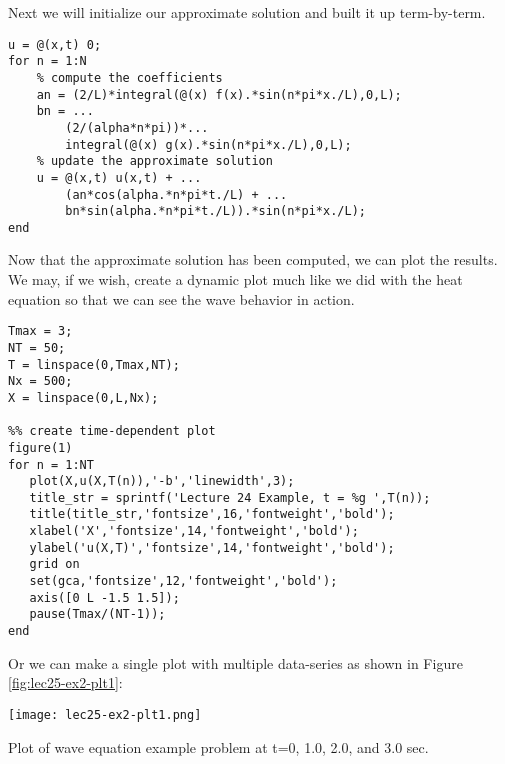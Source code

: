 \vspace{0.5cm}

\noindent Next we will initialize our approximate solution and built it up term-by-term.

\begin{lstlisting}[style=myMatlab, name=lec25-ex2]
u = @(x,t) 0;
for n = 1:N
    % compute the coefficients
    an = (2/L)*integral(@(x) f(x).*sin(n*pi*x./L),0,L);
    bn = ...
        (2/(alpha*n*pi))*...
        integral(@(x) g(x).*sin(n*pi*x./L),0,L);
    % update the approximate solution
    u = @(x,t) u(x,t) + ...
        (an*cos(alpha.*n*pi*t./L) + ...
        bn*sin(alpha.*n*pi*t./L)).*sin(n*pi*x./L); 
end
\end{lstlisting}

\vspace{0.25cm}

\noindent Now that the approximate solution has been computed, we can plot the results.  We may, if we wish, create a dynamic plot much like we did with the heat equation so that we can see the wave behavior in action.

\begin{lstlisting}[style=myMatlab, name=lec25-ex2]
%% make discrete space and time space vectors
Tmax = 3;
NT = 50;
T = linspace(0,Tmax,NT);
Nx = 500;
X = linspace(0,L,Nx);

%% create time-dependent plot
figure(1)
for n = 1:NT
   plot(X,u(X,T(n)),'-b','linewidth',3); 
   title_str = sprintf('Lecture 24 Example, t = %g ',T(n));
   title(title_str,'fontsize',16,'fontweight','bold');
   xlabel('X','fontsize',14,'fontweight','bold');
   ylabel('u(X,T)','fontsize',14,'fontweight','bold');
   grid on
   set(gca,'fontsize',12,'fontweight','bold');
   axis([0 L -1.5 1.5]);
   pause(Tmax/(NT-1));
end
\end{lstlisting}

\vspace{0.25cm}

\noindent Or we can make a single plot with multiple data-series as shown in Figure \ref{fig:lec25-ex2-plt1}:
\begin{marginfigure}
\texttt{[image: lec25-ex2-plt1.png]}
\caption{Plot of wave equation example problem at t=0, 1.0, 2.0, and 3.0 sec.}
\label{fig:lec25-ex2-plt1}
\end{marginfigure}

